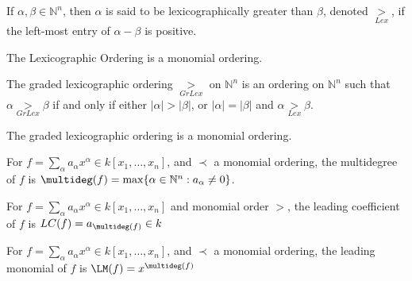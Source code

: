\documentclass[crop=false,class=book,oneside]{standalone}
\begin{document}
                \begin{definition}
                    If $\alpha,\beta \in \mathbb{N}^n$, then $\alpha$
                    is said to be lexicographically greater than
                    $\beta$, denoted $\underset{Lex}{>}$,
                    if the left-most entry of
                    $\alpha-\beta$ is positive.
                \end{definition}
                \begin{theorem}
                    The Lexicographic Ordering
                    is a monomial ordering.
                \end{theorem}
                \begin{definition}
                    The graded lexicographic ordering
                    $\underset{GrLex}{>}$ on $\mathbb{N}^n$ is an
                    ordering on $\mathbb{N}^n$ such that
                    $\alpha\underset{GrLex}{>}\beta$ if and only if
                    either $|\alpha|>|\beta|$, or
                    $|\alpha|=|\beta|$ and
                    $\alpha\underset{Lex}{>}\beta$.
                \end{definition}
                \begin{theorem}
                    The graded lexicographic
                    ordering is a monomial ordering.
                \end{theorem}
                \begin{definition}
                    For
                    $f=\sum_{\alpha}%
                       a_{\alpha}x^{\alpha}\in{k}[x_{1},\hdots,x_{n}]$,
                    and $\prec$ a monomial ordering,
                    the multidegree of $f$ is
                    $\multideg(f)%
                     =\max\{\alpha\in\mathbb{N}^n:a_{\alpha}\ne{0}\}$.
                \end{definition}
                \begin{definition}
                    For
                    $f=\sum_{\alpha}%
                       a_\alpha{x}^\alpha\in k[x_{1},\hdots,x_{n}]$
                    and monomial order $>$, the leading
                    coefficient of $f$ is
                    $LC(f)=a_{\multideg(f)}\in{k}$
                \end{definition}
                \begin{definition}
                    For
                    $f=\sum_{\alpha}%
                       a_{\alpha}x^{\alpha}\in{k}[x_{1},\hdots,x_{n}]$,
                    and $\prec$ a monomial ordering, the leading
                    monomial of $f$ is $\LM(f)=x^{\multideg(f)}$
                \end{definition}
\end{document}
